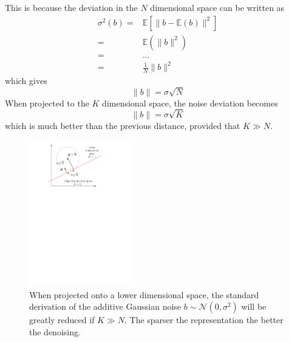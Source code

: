 This is because the deviation in the $N$ dimensional space can be written as
\begin{align*}
\sigma^2(b) =& \mathbb{E}\left[\lVert b-\mathbb{E}(b) \rVert^2 \right]\\
=& \mathbb{E}\left(\lVert b \rVert^2 \right)\\
=& ... \\ %
=& \frac{1}{N}\lVert b \rVert^2
\end{align*}
which gives 
$$ \lVert b \rVert = \sigma\sqrt{N} $$
When projected to the $K$ dimensional space, the noise deviation becomes
$$\lVert b \rVert = \sigma\sqrt{K} $$
which is much better than the previous distance, provided that $K \gg N$. 

\begin{figure}[!ht]\centering
\includegraphics[width=0.4\textwidth]{figures/sparse-reduce-noise.pdf}
\caption{When projected onto a lower dimensional space, the standard derivation of the additive Gaussian noise $b \sim \mathcal{N}(0,\sigma^2)$ will be greatly reduced if $K \gg N$. The sparser the representation the better the denoising. \label{sparse_reduce_noise}}
\end{figure}


